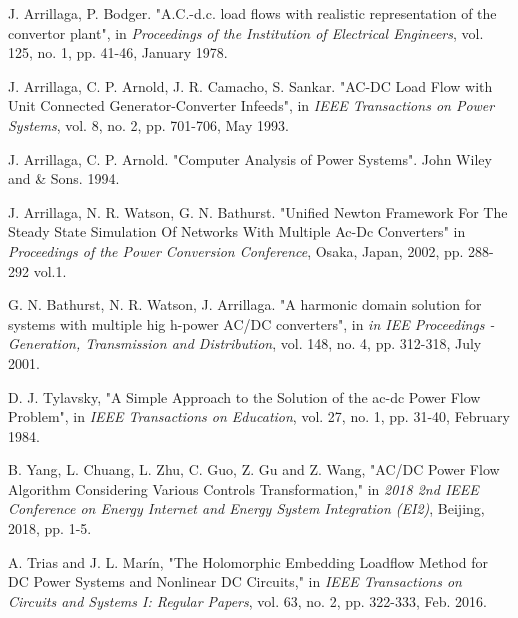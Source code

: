 \documentclass[conference]{IEEEtran}
\begin{document}
%
%
%
\begin{thebibliography}{1}


J. Arrillaga, P. Bodger. "A.C.-d.c. load flows with realistic representation of the convertor plant", in \emph{Proceedings of the Institution of Electrical Engineers}, vol. 125, no. 1, pp. 41-46, January 1978.

J. Arrillaga, C. P. Arnold, J. R. Camacho, S. Sankar. "AC-DC Load Flow with Unit Connected Generator-Converter Infeeds", in \emph{IEEE Transactions on Power Systems}, vol. 8, no. 2, pp. 701-706, May 1993. 

J. Arrillaga, C. P. Arnold. "Computer Analysis of Power Systems". John Wiley and \& Sons. 1994.

J. Arrillaga, N. R. Watson, G. N. Bathurst. "Unified Newton Framework For The Steady State
Simulation Of Networks With Multiple Ac-Dc Converters" in \emph{Proceedings of the Power Conversion Conference}, Osaka, Japan, 2002, pp. 288-292 vol.1.

G. N. Bathurst, N. R. Watson, J. Arrillaga. "A harmonic domain solution for systems with multiple
hig h-power AC/DC converters", in \emph{in IEE Proceedings - Generation, Transmission and Distribution}, vol. 148, no. 4, pp. 312-318, July 2001.

D. J. Tylavsky, "A Simple Approach to the Solution of the ac-dc Power Flow Problem", in \emph{IEEE Transactions on Education}, vol. 27, no. 1, pp. 31-40, February 1984.

B. Yang, L. Chuang, L. Zhu, C. Guo, Z. Gu and Z. Wang, "AC/DC Power Flow Algorithm Considering Various Controls Transformation," in \emph{2018 2nd IEEE Conference on Energy Internet and Energy System Integration (EI2)}, Beijing, 2018, pp. 1-5.

A. Trias and J. L. Marín, "The Holomorphic Embedding Loadflow Method for DC Power Systems and Nonlinear DC Circuits," in \emph{IEEE Transactions on Circuits and Systems I: Regular Papers}, vol. 63, no. 2, pp. 322-333, Feb. 2016.


\end{thebibliography}
\end{document}
